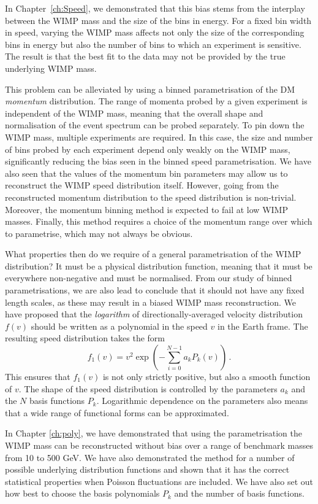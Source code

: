 In Chapter~\ref{ch:Speed}, we demonstrated that this bias stems from the interplay between the WIMP mass and the size of the bins in energy. For a fixed bin width in speed, varying the WIMP mass affects not only the size of the corresponding bins in energy but also the number of bins to which an experiment is sensitive. The result is that the best fit to the data may not be provided by the true underlying WIMP mass. 

This problem can be alleviated by using a binned parametrisation of the DM \textit{momentum} distribution. The range of momenta probed by a given experiment is independent of the WIMP mass, meaning that the overall shape and normalisation of the event spectrum can be probed separately. To pin down the WIMP mass, multiple experiments are required. In this case, the size and number of bins probed by each experiment depend only weakly on the WIMP mass, significantly reducing the bias seen in the binned speed parametrisation. We have also seen that the values of the momentum bin parameters may allow us to reconstruct the WIMP speed distribution itself. However, going from the reconstructed momentum distribution to the speed distribution is non-trivial. Moreover, the momentum binning method is expected to fail at low WIMP masses. Finally, this method requires a choice of the momentum range over which to parametrise, which may not always be obvious.

What properties then do we require of a general parametrisation of the WIMP distribution? It must be a physical distribution function, meaning that it must be everywhere non-negative and must be normalised. From our study of binned parametrisations, we are also lead to conclude that it should not have any fixed length scales, as these may result in a biased WIMP mass reconstruction. We have proposed that the \textit{logarithm} of directionally-averaged velocity distribution $f(v)$ should be written as a polynomial in the speed $v$ in the Earth frame. The resulting speed distribution takes the form
\begin{equation}
f_1(v) = v^2 \exp \left(-\sum_{i=0}^{N-1} a_k P_k(v)\right)\,.
\end{equation}
This ensures that $f_1(v)$ is not only strictly positive, but also a smooth function of $v$. The shape of the speed distribution is controlled by the parameters $a_k$ and the $N$ basis functions $P_k$. Logarithmic dependence on the parameters also means that a wide range of functional forms can be approximated.

In Chapter \ref{ch:poly}, we have demonstrated that using the parametrisation the WIMP mass can be reconstructed without bias over a range of benchmark masses from 10 to 500 GeV. We have also demonstrated the method for a number of possible underlying distribution functions and shown that it has the correct statistical properties when Poisson fluctuations are included. We have also set out how best to choose the basis polynomials $P_k$ and the number of basis functions.

